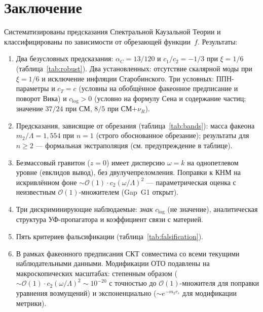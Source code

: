 \documentclass[12pt,a4paper]{article}
\theoremstyle{plain}
\theoremstyle{definition}
\theoremstyle{remark}
\newcommand{\order}{\mathcal{O}}
\begin{document}
{{{{{{%
\section{Заключение}
\label{sec:conclusions}

Систематизированы предсказания Спектральной Каузальной Теории
и классифицированы по зависимости от обрезающей функции~$f$.
Результаты:

\begin{enumerate}[(1)]
\item Два безусловных предсказания: $\alpha_C = 13/120$ и
  $c_1/c_2 = -1/3$ при $\xi = 1/6$
  (таблица~\ref{tab:robust}). Два установленных: отсутствие
  скалярной моды при $\xi = 1/6$ и исключение инфляции
  Старобинского. Три условных: ППН-параметры и $c_T = c$
  (условны на обобщённое факеонное предписание и поворот
  Вика) и $c_{\log} > 0$ (условно на формулу Сена и
  содержание частиц; значение $37/24$ при СМ, $8/5$ при
  СМ$+\nu_R$).

\item Предсказания, зависящие от обрезания
  (таблица~\ref{tab:bands}): масса факеона
  $m_2/\Lambda = 1{,}554$ при $n = 1$ (строго обоснованное
  обрезание); результаты для $n \geq 2$ --- формальная
  экстраполяция (см. предупреждение в таблице).

\item Безмассовый гравитон ($z = 0$) имеет дисперсию
  $\omega = k$ на однопетлевом уровне (евклидов вывод), без
  двулучепреломления. Поправки к КНМ на искривлённом фоне
  $\sim \order(1) \cdot c_2(\omega/\Lambda)^2$ --- параметрическая
  оценка с неизвестным $\order(1)$-множителем (Gap~G1 открыт).

\item Три дискриминирующие наблюдаемые: \emph{знак} $c_{\log}$
  (не значение), аналитическая структура УФ-пропагатора
  и коэффициент связи с материей.

\item Пять критериев фальсификации
  (таблица~\ref{tab:falsification}).

\item В рамках факеонного предписания СКТ совместима со всеми
  текущими наблюдательными данными. Модификации ОТО подавлены
  на макроскопических масштабах:
  степенным образом ($\sim \order(1) \cdot c_2(\omega/\Lambda)^2
  \sim 10^{-20}$ с точностью до $\order(1)$-множителя
  для поправки уравнения возмущений) и экспоненциально
  ($\sim e^{-m_2 r_s}$ для модификации метрики).


\end{enumerate}}}}}}}
\end{document}
